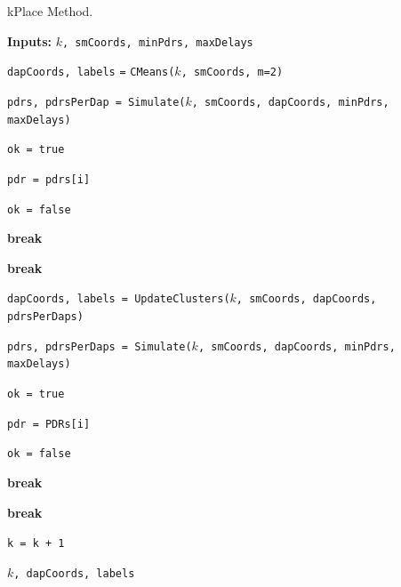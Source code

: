 \documentclass[a4paper,fleqn]{cas-dc}
\begin{document}
\begin{algorithm}[ht]
    \caption {kPlace Method.}
    \label{alg:method}
    
    \textbf{Inputs:} {\texttt{$k$, smCoords, minPdrs, maxDelays}}
    
    
     {
        \texttt{dapCoords, labels} \texttt{=} \texttt{CMeans($k$, smCoords, m=2)}
        
        \texttt{pdrs, pdrsPerDap = Simulate($k$, smCoords, dapCoords, minPdrs, maxDelays)} 

        \texttt{ok = true}
        
         {
            \texttt{pdr = pdrs[i]}
            
             {
                \texttt{ok = false}

                \textbf{break}
            }
        }

         {
            \textbf{break}
        }

        \texttt{dapCoords, labels = UpdateClusters($k$, smCoords, dapCoords, pdrsPerDaps)}

        \texttt{pdrs, pdrsPerDaps = Simulate($k$, smCoords, dapCoords, minPdrs, maxDelays)}

        \texttt{ok = true}
        
         {
            \texttt{pdr = PDRs[i]}
            
             {
                \texttt{ok = false}

                \textbf{break}
            }
        }

         {
            \textbf{break}
        }

        \texttt{k = k + 1}
    }
    
    \Return \texttt{$k$, dapCoords, labels}
\end{algorithm}
\end{document}
